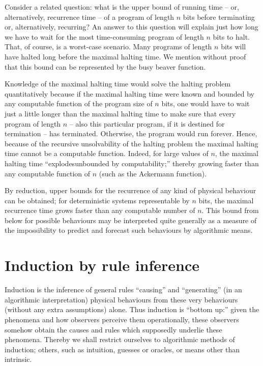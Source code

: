Consider a related question: what is the upper bound of running time  --  or,
alternatively, recurrence time  --  of a program of length $n$ bits before
terminating  or, alternatively, recurring?
An answer to this question will explain just how long we have to
wait for the most time-consuming program of length $n$ bits to
halt. That, of course, is a worst-case scenario. Many programs of
length $n$ bits will have halted long  before the maximal halting time.
We mention without proof~\cite{chaitin-ACM,chaitin-bb}  that
this bound can be represented by the busy beaver function.

Knowledge of the maximal halting time would solve the halting
problem quantitatively
because if the maximal halting time were known
and bounded by any computable function of the program size of $n$ bits,
one would have to wait
just a little longer than the maximal halting time to make sure
that every program of length $n$  --  also this particular program, if it is destined for termination  --
has terminated.
Otherwise, the program would run forever.
Hence, because of the recursive unsolvability of the halting problem
the maximal halting time cannot be a computable function.
Indeed, for large values of $n$, the maximal halting time ``explodesunbounded by computability;''
thereby
growing faster than any computable function  of $n$ (such as the Ackermann function).


By reduction, upper bounds for the recurrence of any kind of physical behaviour can be obtained;
for deterministic systems representable by $n$ bits,
the maximal recurrence time grows faster than any computable number
of $n$.
This bound from below for possible behaviours may be interpreted quite generally
as a measure
of the impossibility to predict and forecast such behaviours by algorithmic means.


\chapter{Induction by rule inference}
\label{2016-pu-book-chapter-ri}

Induction is the inference of general rules
``causing'' and ``generating'' (in an algorithmic interpretation) physical behaviours from these very behaviours (without any extra assumptions) alone.
Thus induction is ``bottom up:'' given the phenomena and how observers perceive them operationally, these observers somehow obtain the causes and rules
which supposedly underlie these phenomena.
Thereby we shall restrict ourselves to algorithmic methods of induction; others, such as intuition, guesses or oracles, or means other than intrinsic.


